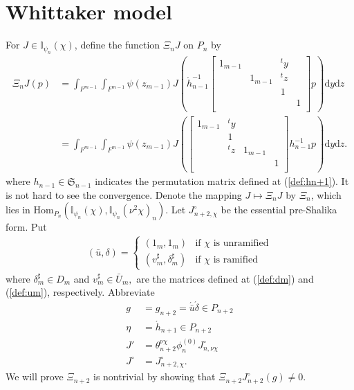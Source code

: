 \documentclass[11pt]{amsart}
\newcommand\Sf{{\mathfrak{S}}}
\newcommand\dr{\mathrm{d}}
\newcommand\Ib{{\mathbb{I}}}
\newcommand\1{\mathbf{1}}
\newcommand\ac{\acute}
\newcommand\Hom{{\mathrm{Hom}}}%
\newcommand\bu{\bar{u}}
\numberwithin{equation}{section}
\begin{document}
\section{Whittaker model}\label{sec:Wm} 
For $J \in \Ib_{\psi_{n}}(\chi)$, define the function $\Xi_{n}J$ on $P_{n}$ by
\begin{align*}
\Xi_{n}J(p) 
&= \int_{F^{m-1}} \int_{F^{m-1}} \psi(z_{m-1}) J(\ac{h}_{n-1}^{-1}\begin{bmatrix}
1_{m-1}&& {}^t y&  \\
& 1_{m-1}& {}^t z & \\
&  & 1&  \\
& & & 1 \\
\end{bmatrix}p) \dr y \dr z \\
&= \int_{F^{m-1}} \int_{F^{m-1}} \psi(z_{m-1}) J(\begin{bmatrix}
1_{m-1}&{}^t y & &  \\
& 1& & \\
& {}^t z & 1_{m-1}&  \\
& & & 1 \\
\end{bmatrix}h_{n-1}^{-1} p) \dr y \dr z. 
\end{align*} 
where $h_{n-1} \in \Sf_{n-1}$ indicates the permutation matrix defined at (\ref{def:hn+1}).
It is not hard to see the convergence.
Denote the mapping $J \mapsto \Xi_{n}J$ by $\Xi_{n}$, which lies in $\Hom_{P_{n}}(\Ib_{\psi_{n}}(\chi), \Ib_{\psi_{n}}(\nu^2\chi)_{n})$.
Let $J_{n+2,\chi}^\circ$ be the essential pre-Shalika form.
Put
\begin{align*}
(\bu, \delta)= 
\begin{cases}
(1_m,1_m) & \mbox{if $\chi$ is unramified} \\
(v_m^\sharp,\delta_m^\sharp) & \mbox{if $\chi$ is ramified} 
\end{cases}
\end{align*}
where $\delta_m^\sharp \in D_m$ and $v_m^\sharp \in \bar{U}_m,$ are the matrices defined at (\ref{def:dm}) and (\ref{def:um}), respectively.
Abbreviate
\begin{align*}
g &= g_{n+2} = \ac{\bu}\ac{\delta} \in P_{n+2} \\
\eta &= \ac{h}_{n+1} \in P_{n+2} \\
J' &= \theta_{n+2}^{\nu \chi} \phi_n^{(0)} J_{n, \nu\chi}^\circ\\
J^\circ &= J_{n+2,\chi}^\circ.
\end{align*}
We will prove $\Xi_{n+2}$ is nontrivial by showing that $\Xi_{n+2} J_{n+2}^\circ(g) \neq 0$.
\end{document}
